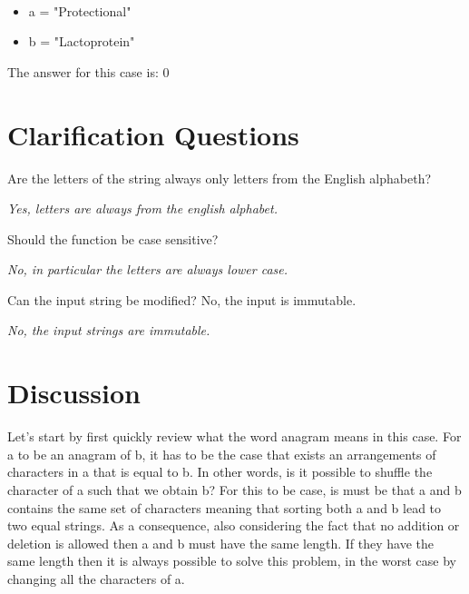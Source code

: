 \begin{example}
	\hfill \\
	\begin{itemize}
		\item[] 	a = "Protectional"
		\item[] 	b = "Lactoprotein"
	\end{itemize}
	 The answer for this case is: 0

\end{example}


\section{Clarification Questions}

\begin{QandA}
	\item Are the letters of the string always only letters from the English alphabeth? 
	\begin{answered}
		\textit{Yes, letters are always from the english alphabet.}
	\end{answered}
	
	\item Should the function be case sensitive? 
	\begin{answered}
		\textit{No, in particular the letters are always lower case.}
	\end{answered}
	\item Can the input string be modified? No, the input is immutable.
	\begin{answered}
		\textit{No, the input strings are immutable.}
	\end{answered}
\end{QandA}

\section{Discussion}
Let's start by first quickly review what the word anagram means in this case. For a to be an anagram of b, it has to be the case that exists an arrangements of characters in a that is equal to b. In other words, is it possible to shuffle the character of a such that we obtain b? For this to be case, is must be that a and b contains the same set of characters meaning that sorting both a and b lead to two equal strings. As a consequence, also considering the  fact that no addition or deletion is allowed then a and b must have the same length. If they have the same length then it is always possible to solve this problem, in the worst case by changing all the characters of a.

